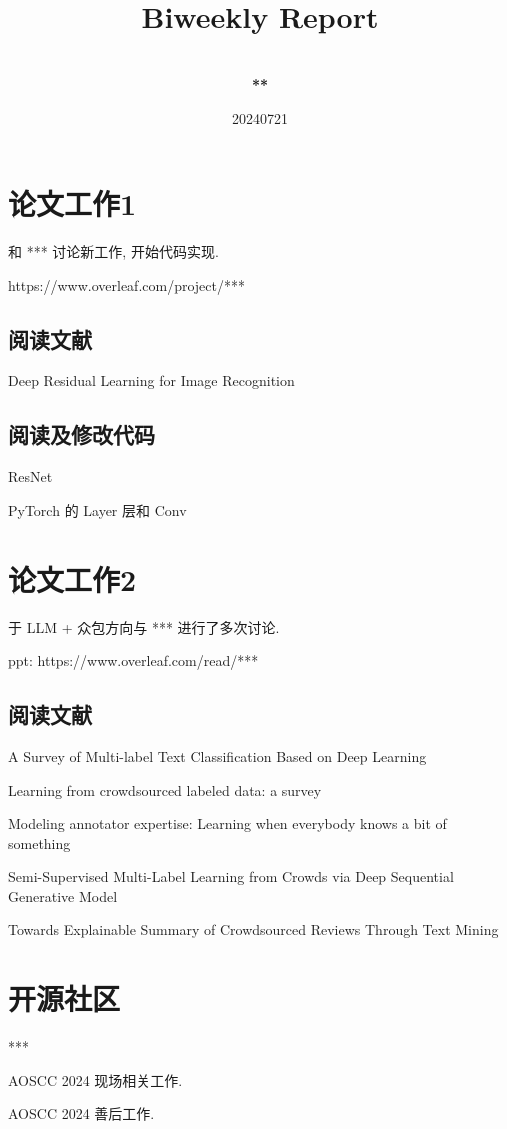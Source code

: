 \documentclass[a4paper]{article}
\title{
    \vspace*{1.0in}
     \\
    \vspace*{1in}
    \textbf{\Huge Biweekly Report}
    \vspace{0.5in}
}
\author{ \\
    \textbf{\huge ***} \\
    \vspace*{1in}
}
\date{\LARGE 20240721}
\begin{document}
\LARGE

\maketitle
\tableofcontents
\thispagestyle{empty}
\newpage

\section{论文工作1}

和 *** 讨论新工作, 开始代码实现.

https://www.overleaf.com/project/***

\subsection{阅读文献}

Deep Residual Learning for Image Recognition

\subsection{阅读及修改代码}

ResNet

PyTorch 的 Layer 层和 Conv

\section{论文工作2}

于 LLM + 众包方向与 *** 进行了多次讨论.

ppt: https://www.overleaf.com/read/***

\subsection{阅读文献}

A Survey of Multi-label Text Classification Based on Deep Learning

Learning from crowdsourced labeled data: a survey

Modeling annotator expertise: Learning when everybody knows a bit of something

Semi-Supervised Multi-Label Learning from Crowds via Deep Sequential Generative Model

Towards Explainable Summary of Crowdsourced Reviews Through Text Mining

\section{开源社区}

***

AOSCC 2024 现场相关工作.

AOSCC 2024 善后工作.
\end{document}
